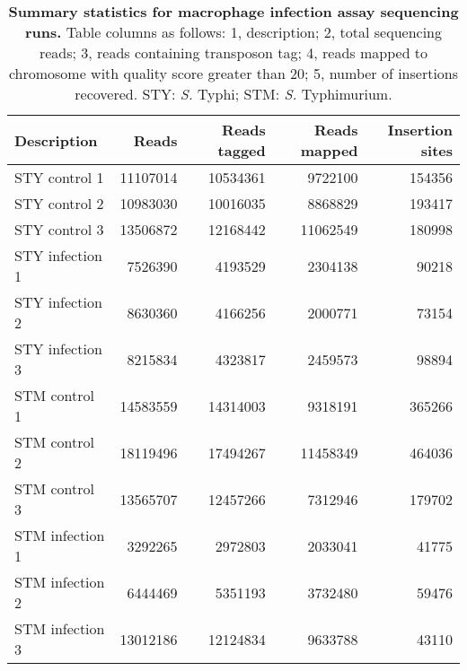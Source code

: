 %
\begin{table}
   \tiny
   \centering
   \noindent
    \caption[Summary statistics for macrophage infection assay sequencing runs]{\textbf{Summary statistics for macrophage infection assay sequencing runs.} Table columns as follows: 1, description; 2, total sequencing reads; 3, reads containing transposon tag; 4, reads mapped to chromosome with quality score greater than 20; 5, number of insertions recovered. STY: \textit{S.} Typhi; STM: \textit{S.} Typhimurium. }
    \begin{tabular}{ l
    				r
				r
				r
				r
				}
   
    \\
     \toprule
    \textbf{Description} & \textbf{Reads} & \textbf{Reads tagged} & \textbf{Reads mapped} & \textbf{Insertion sites} \\
    \midrule
    STY control 1 & 11107014 & 10534361 & 9722100 & 154356\\
    STY control 2 & 10983030 & 10016035 & 8868829 & 193417\\
    STY control 3 & 13506872 & 12168442 & 11062549 & 180998\\
    STY infection 1 & 7526390 & 4193529 & 2304138 & 90218\\
    STY infection 2 & 8630360 & 4166256 & 2000771 & 73154\\
    STY infection 3 & 8215834 & 4323817 & 2459573 & 98894\\
    STM control 1 & 14583559 & 14314003 & 9318191 & 365266\\
    STM control 2 & 18119496 & 17494267 & 11458349 & 464036\\
    STM control 3 & 13565707 & 12457266 & 7312946 & 179702\\
    STM infection 1 &  3292265 & 2972803 & 2033041 & 41775\\
    STM infection 2 & 6444469 & 5351193 & 3732480 & 59476\\
    STM infection 3 & 13012186 & 12124834 & 9633788 & 43110\\
    \bottomrule
    \end{tabular}%
    \label{tab:readmap}%
\end{table}

